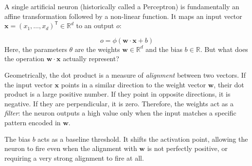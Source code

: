 \documentclass{tufte-handout}
\begin{document}
A single artificial neuron (historically called a Perceptron) is fundamentally an affine transformation followed by a non-linear function. It maps an input vector $\mathbf{x} = (x_1,\dots,x_d)^{\mathsf{T}} \in \mathbb{R}^d$ to an output $o$:

 $$ o = \phi(\mathbf{w} \cdot \mathbf{x} + b)
 $$ 
Here, the parameters $\theta$ are the weights $\mathbf{w} \in \mathbb{R}^d$ and the bias $b \in \mathbb{R}$. But what does the operation $\mathbf{w} \cdot \mathbf{x}$ actually represent? 

Geometrically, the dot product is a measure of \textit{alignment} between two vectors. If the input vector $\mathbf{x}$ points in a similar direction to the weight vector $\mathbf{w}$, their dot product is a large positive number. If they point in opposite directions, it is negative. If they are perpendicular, it is zero. Therefore, the weights act as a \textit{filter}: the neuron outputs a high value only when the input matches a specific pattern encoded in $\mathbf{w}$.

The bias $b$ acts as a baseline threshold. It shifts the activation point, allowing the neuron to fire even when the alignment with $\mathbf{w}$ is not perfectly positive, or requiring a very strong alignment to fire at all.
\end{document}

